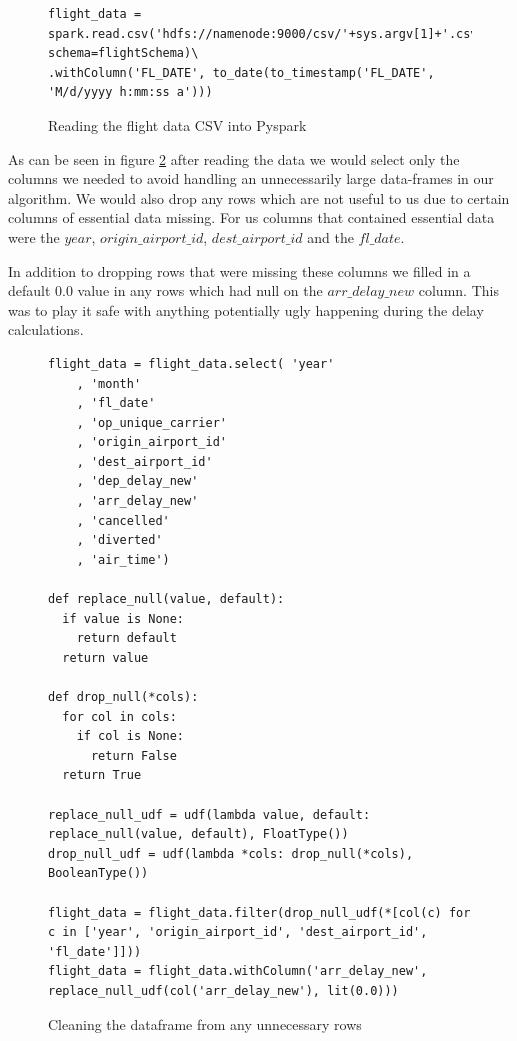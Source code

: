 \begin{figure}[H]
\centering
\begin{lstlisting}
flight_data = spark.read.csv('hdfs://namenode:9000/csv/'+sys.argv[1]+'.csv', schema=flightSchema)\
.withColumn('FL_DATE', to_date(to_timestamp('FL_DATE', 'M/d/yyyy h:mm:ss a')))
\end{lstlisting}
\caption{Reading the flight data CSV into Pyspark}
\label{fig:read_pysparkcsv}
\end{figure}

As can be seen in figure \ref{fig:cleaning_pyspark} after reading the data we would select only the columns we needed to avoid handling an unnecessarily large data-frames in our algorithm. We would also drop any rows which are not useful to us due to certain columns of essential data missing. For us columns that contained essential data were the $year$, $origin\_airport\_id$, $dest\_airport\_id$ and the $fl\_date$. 

In addition to dropping rows that were missing these columns we filled in a default 0.0 value in any rows which had null on the $arr\_delay\_new$ column. This was to play it safe with anything potentially ugly happening during the delay calculations.

\begin{figure}[H]
\centering
\begin{lstlisting}
flight_data = flight_data.select( 'year'
    , 'month'
    , 'fl_date'
    , 'op_unique_carrier'
    , 'origin_airport_id'
    , 'dest_airport_id'
    , 'dep_delay_new'
    , 'arr_delay_new'
    , 'cancelled'
    , 'diverted'
    , 'air_time')

def replace_null(value, default):
  if value is None:
    return default
  return value

def drop_null(*cols):
  for col in cols:
    if col is None:
      return False
  return True

replace_null_udf = udf(lambda value, default: replace_null(value, default), FloatType())
drop_null_udf = udf(lambda *cols: drop_null(*cols), BooleanType())

flight_data = flight_data.filter(drop_null_udf(*[col(c) for c in ['year', 'origin_airport_id', 'dest_airport_id', 'fl_date']]))
flight_data = flight_data.withColumn('arr_delay_new', replace_null_udf(col('arr_delay_new'), lit(0.0)))
\end{lstlisting}
\caption{Cleaning the dataframe from any unnecessary rows}
\label{fig:cleaning_pyspark}
\end{figure}


